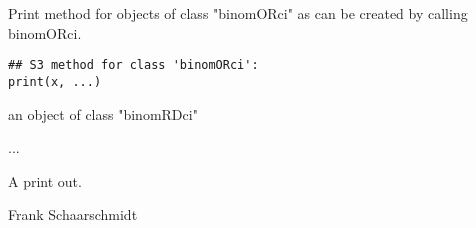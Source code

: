 \begin{Description}\relax
Print method for objects of class "binomORci" as can be created by calling binomORci.
\end{Description}
\begin{Usage}
\begin{verbatim}
## S3 method for class 'binomORci':
print(x, ...)
\end{verbatim}
\end{Usage}
\begin{Arguments}
\begin{ldescription}
\item[\code{x}] an object of class "binomRDci"  
\item[\code{...}] ... 
\end{ldescription}
\end{Arguments}
\begin{Value}
A print out.
\end{Value}
\begin{Author}\relax
Frank Schaarschmidt
\end{Author}

